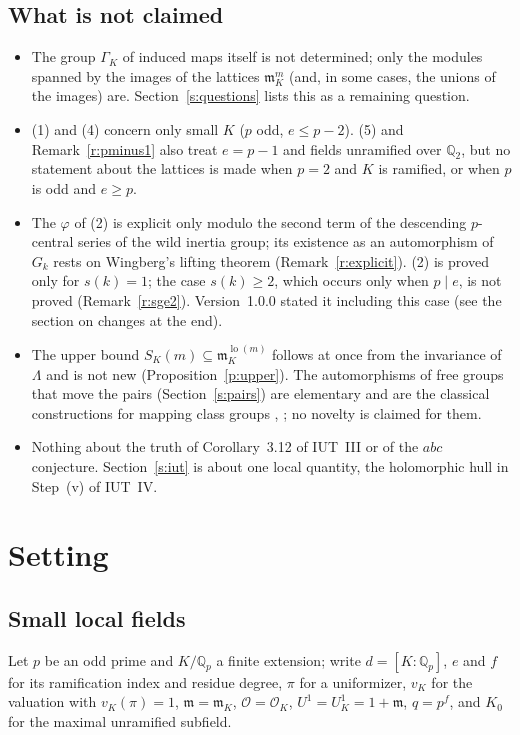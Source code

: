 \documentclass[11pt,a4paper]{article}
\newcommand{\Qp}{\mathbb{Q}_p}
\newcommand{\cO}{\mathcal{O}}
\newcommand{\fm}{\mathfrak{m}}
\newcommand{\lo}{\operatorname{lo}}
\theoremstyle{plain}
\theoremstyle{definition}
\theoremstyle{remark}
\begin{document}
\subsection{What is not claimed}
\begin{itemize}
\item The group $\Gamma_K$ of induced maps itself is not determined; only the modules spanned by the images of the
lattices $\fm_K^m$ (and, in some cases, the unions of the images) are. Section~\ref{s:questions} lists this as a
remaining question.
\item (1) and (4) concern only small $K$ ($p$ odd, $e\le p-2$). (5) and Remark~\ref{r:pminus1} also treat $e=p-1$ and
fields unramified over $\mathbb Q_2$, but no statement about the lattices is made when $p=2$ and $K$ is ramified, or
when $p$ is odd and $e\ge p$.
\item The $\varphi$ of (2) is explicit only modulo the second term of the descending $p$-central series of the wild
inertia group; its existence as an automorphism of $G_k$ rests on Wingberg's lifting theorem
(Remark~\ref{r:explicit}). (2) is proved only for $s(k)=1$; the case $s(k)\ge2$, which occurs only when $p\mid e$, is
not proved (Remark~\ref{r:sge2}). Version~1.0.0 stated it including this case (see the section on changes at the
end).
\item The upper bound $S_K(m)\subseteq\fm_K^{\lo(m)}$ follows at once from the invariance of $\Lambda$ and is not new
(Proposition~\ref{p:upper}). The automorphisms of free groups that move the pairs (Section~\ref{s:pairs}) are
elementary and are the classical constructions for mapping class groups \cite[Rem.~2.16, Thm.~2.17]{Kondo},
\cite[\S7]{Ku}; no novelty is claimed for them.
\item Nothing about the truth of Corollary~3.12 of IUT~III or of the $abc$ conjecture. Section~\ref{s:iut} is about
one local quantity, the holomorphic hull in Step~(v) of IUT~IV.
\end{itemize}

\section{Setting}\label{s:setting}

\subsection{Small local fields}
Let $p$ be an odd prime and $K/\Qp$ a finite extension; write $d=[K:\Qp]$, $e$ and $f$ for its ramification index
and residue degree, $\pi$ for a uniformizer, $v_K$ for the valuation with $v_K(\pi)=1$, $\fm=\fm_K$, $\cO=\cO_K$,
$U^1=U^1_K=1+\fm$, $q=p^f$, and $K_0$ for the maximal unramified subfield.
\end{document}
